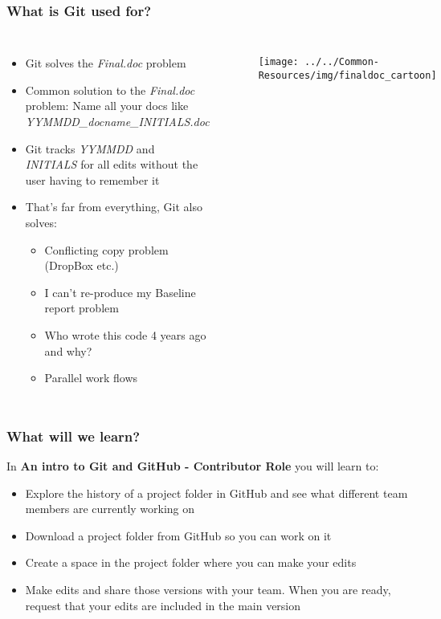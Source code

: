 \documentclass[aspectratio=169]{beamer} %
\begin{document}
\begin{frame}
\frametitle{What is Git used for?}

	\begin{columns}[c]

		\begin{itemize}
			\item Git solves the \textit{Final.doc} problem
			\item <2->Common solution to the \textit{Final.doc} problem: Name all your docs like \textit{YYMMDD\_docname\_INITIALS.doc}
			\item <3->Git tracks \textit{YYMMDD} and \textit{INITIALS} for all edits  without the user having to remember it
			\item <4->That's far from everything, Git also solves:
			\begin{itemize}
				\item <4->Conflicting copy problem (DropBox etc.)
				\item <4->I can't re-produce my Baseline report problem
				\item <4->Who wrote this code 4 years ago and why?
				\item <4->Parallel work flows
			\end{itemize}
		\end{itemize}

		\begin{figure}
			\centering
			\texttt{[image: ../../Common-Resources/img/finaldoc\_cartoon]}
			\label{fig:finaldoccartoon}
		\end{figure}

	\end{columns}
\end{frame}




\begin{frame}
\frametitle{What will we learn?}

	In \textbf{An intro to Git and GitHub - Contributor Role} you will learn to:

	\begin{itemize}
		\item Explore the history of a project folder in GitHub and see what different team members are currently working on
		\item Download a project folder from GitHub so you can work on it
		\item Create a space in the project folder where you can make your edits
		\item Make edits and share those versions with your team. When you are ready, request that your edits are included in the main version
	\end{itemize}

\end{frame}
\end{document}

